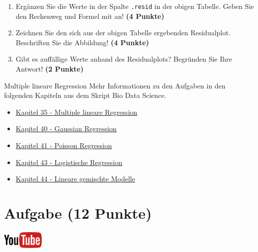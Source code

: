 \documentclass[a4paper, 10pt]{scrartcl}\usepackage[]{graphicx}\usepackage[]{xcolor}
\begin{document}
\begin{enumerate}
\item Erg{\"a}nzen Sie die Werte in der Spalte \texttt{.resid} in der obigen
  Tabelle. Geben Sie den Rechenweg und Formel mit an! \textbf{(4 Punkte)}
\item Zeichnen Sie den sich aus der obigen Tabelle ergebenden
  Residualplot. Beschriften Sie die Abbildung! \textbf{(4 Punkte)}
\item Gibt es auff{\"a}llige Werte anhand des Residualplots? Begr{\"u}nden Sie Ihre
  Antwort! \textbf{(2 Punkte)}
\end{enumerate}
 
\clearpage
\begin{graybox}{Multiple lineare Regression}
Mehr Informationen zu den Aufgaben in den folgenden Kapiteln aus dem Skript Bio Data Science.
  \begin{itemize}
  \item \href{https://jkruppa.github.io/stat-modeling-basic.html}{Kapitel 35 - Multiple lineare Regression}
  \item \href{https://jkruppa.github.io/stat-modeling-gaussian.html}{Kapitel 40 - Gaussian Regression}
  \item \href{https://jkruppa.github.io/stat-modeling-poisson.html}{Kapitel 41 - Poisson Regression}
  \item \href{https://jkruppa.github.io/stat-modeling-logistic.html}{Kapitel 43 - Logistische Regression}
  \item \href{https://jkruppa.github.io/stat-modeling-mixed.html}{Kapitel 44 - Lineare gemischte Modelle}
  \end{itemize}
\end{graybox}
\clearpage

\section{Aufgabe \hfill (12 Punkte)}

\hfill\href{https://youtu.be/lHzRgm7hPw0}{\includegraphics[width =
  2cm]{img/youtube}}\\[1Ex]
\end{document}

